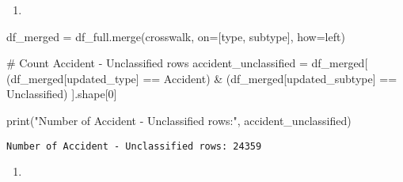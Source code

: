 \documentclass[
  letterpaper,
  DIV=11,
  numbers=noendperiod]{scrartcl}
\newenvironment{Shaded}{\begin{snugshade}}{\end{snugshade}}
\newcommand{\BuiltInTok}[1]{\textcolor[rgb]{0.00,0.23,0.31}{#1}}
\newcommand{\CommentTok}[1]{\textcolor[rgb]{0.37,0.37,0.37}{#1}}
\newcommand{\DecValTok}[1]{\textcolor[rgb]{0.68,0.00,0.00}{#1}}
\newcommand{\NormalTok}[1]{\textcolor[rgb]{0.00,0.23,0.31}{#1}}
\newcommand{\OperatorTok}[1]{\textcolor[rgb]{0.37,0.37,0.37}{#1}}
\newcommand{\StringTok}[1]{\textcolor[rgb]{0.13,0.47,0.30}{#1}}
\providecommand{\tightlist}{%
  \setlength{\itemsep}{0pt}\setlength{\parskip}{0pt}}\usepackage{longtable,booktabs,array}
\begin{document}
\begin{enumerate}
\def\labelenumi{\arabic{enumi}.}
\setcounter{enumi}{2}
\tightlist
\item
\end{enumerate}

\begin{Shaded}
\begin{Highlighting}[]
\NormalTok{df\_merged }\OperatorTok{=}\NormalTok{ df\_full.merge(crosswalk, on}\OperatorTok{=}\NormalTok{[}\StringTok{\textquotesingle{}type\textquotesingle{}}\NormalTok{, }\StringTok{\textquotesingle{}subtype\textquotesingle{}}\NormalTok{], how}\OperatorTok{=}\StringTok{\textquotesingle{}left\textquotesingle{}}\NormalTok{)}

\CommentTok{\# Count Accident {-} Unclassified rows}
\NormalTok{accident\_unclassified }\OperatorTok{=}\NormalTok{ df\_merged[}
\NormalTok{    (df\_merged[}\StringTok{\textquotesingle{}updated\_type\textquotesingle{}}\NormalTok{] }\OperatorTok{==} \StringTok{\textquotesingle{}Accident\textquotesingle{}}\NormalTok{) }\OperatorTok{\&} 
\NormalTok{    (df\_merged[}\StringTok{\textquotesingle{}updated\_subtype\textquotesingle{}}\NormalTok{] }\OperatorTok{==} \StringTok{\textquotesingle{}Unclassified\textquotesingle{}}\NormalTok{)}
\NormalTok{].shape[}\DecValTok{0}\NormalTok{]}

\BuiltInTok{print}\NormalTok{(}\StringTok{"Number of Accident {-} Unclassified rows:"}\NormalTok{, accident\_unclassified)}
\end{Highlighting}
\end{Shaded}

\begin{verbatim}
Number of Accident - Unclassified rows: 24359
\end{verbatim}

\begin{enumerate}
\def\labelenumi{\arabic{enumi}.}
\setcounter{enumi}{3}
\tightlist
\item
\end{enumerate}
\end{document}
